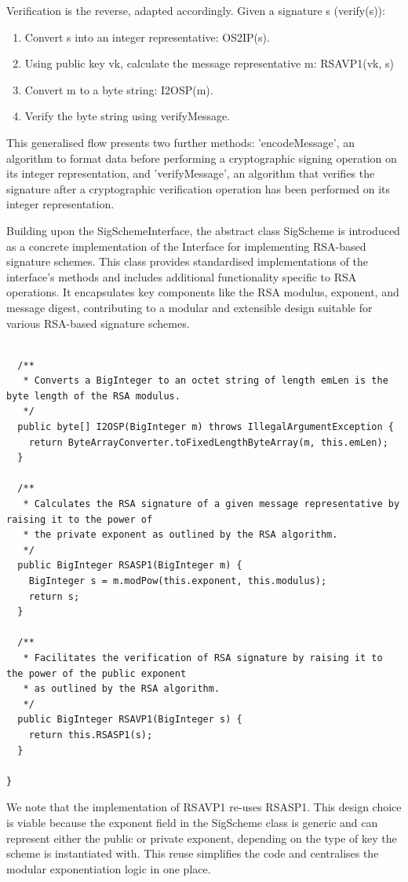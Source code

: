 \documentclass[]{final_report}
\theoremstyle{definition}
\begin{document}
Verification is the reverse, adapted accordingly. Given a signature s (verify(s)):

\begin{enumerate}
\item Convert s into an integer representative: OS2IP(s).

\item Using public key vk, calculate the message representative m: RSAVP1(vk, s)

\item Convert m to a byte string: I2OSP(m).

\item Verify the byte string using verifyMessage.
\end{enumerate}

This generalised flow presents two further methods: 'encodeMessage', an algorithm to format data before performing a cryptographic signing operation on its integer representation, and 'verifyMessage', an algorithm that verifies the signature after a cryptographic verification operation has been performed on its integer representation. 
 
Building upon the SigSchemeInterface, the abstract class SigScheme is introduced as a concrete implementation of the Interface for implementing RSA-based signature schemes. This class provides standardised implementations of the interface's methods and 
includes additional functionality specific to RSA operations. It encapsulates key components like the RSA modulus, exponent, and message digest, contributing to a modular and extensible design suitable for various RSA-based signature schemes.

\begin{lstlisting}[caption=Implementation of RSA primitives]

  /**
   * Converts a BigInteger to an octet string of length emLen is the byte length of the RSA modulus.
   */
  public byte[] I2OSP(BigInteger m) throws IllegalArgumentException {
    return ByteArrayConverter.toFixedLengthByteArray(m, this.emLen);
  }

  /**
   * Calculates the RSA signature of a given message representative by raising it to the power of
   * the private exponent as outlined by the RSA algorithm.
   */
  public BigInteger RSASP1(BigInteger m) {
    BigInteger s = m.modPow(this.exponent, this.modulus);
    return s;
  }

  /**
   * Facilitates the verification of RSA signature by raising it to the power of the public exponent
   * as outlined by the RSA algorithm.
   */
  public BigInteger RSAVP1(BigInteger s) {
    return this.RSASP1(s);
  }

}
 \end{lstlisting}
We note that the implementation of RSAVP1 re-uses RSASP1. This design choice is viable because the exponent field in the SigScheme class is generic and can represent either the public or private exponent, depending on the type of key the scheme is instantiated with. This reuse simplifies the code and centralises the modular exponentiation logic in one place.
\newline
\end{document}

